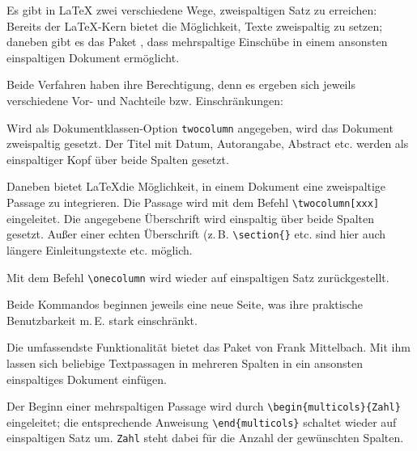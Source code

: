 Es gibt in \LaTeX{} zwei verschiedene Wege, zweispaltigen Satz zu erreichen:
Bereits der \LaTeX -Kern bietet die Möglichkeit, Texte zweispaltig zu setzen;
daneben gibt es das Paket , dass mehrspaltige Einschübe in einem ansonsten
einspaltigen Dokument ermöglicht.

Beide Verfahren haben ihre Berechtigung, denn es ergeben sich jeweils verschiedene
Vor- und Nachteile bzw. Einschränkungen:


Wird als Dokumentklassen-Option \lstinline/twocolumn/ angegeben, wird das Dokument 
zweispaltig gesetzt. 
Der Titel mit Datum, Autorangabe, Abstract etc. werden als einspaltiger Kopf über beide 
Spalten gesetzt.



Daneben bietet \LaTeX die Möglichkeit, in einem Dokument eine zweispaltige Passage
zu integrieren. Die Passage wird mit dem Befehl \lstinline/\twocolumn[xxx] /
eingeleitet. Die angegebene Überschrift wird einspaltig über beide Spalten gesetzt.
Außer einer echten Überschrift (z.\,B. \lstinline/\section{}/ etc. sind hier auch
längere Einleitungstexte etc. möglich.

Mit dem Befehl \lstinline/\onecolumn/ wird wieder auf einspaltigen Satz zurückgestellt.

Beide Kommandos beginnen jeweils eine neue Seite, was ihre praktische Benutzbarkeit m.\,E.
stark einschränkt.



\begin{multicols}{2}
 Die umfassendste Funktionalität bietet das Paket  von Frank Mittelbach.
 Mit ihm lassen sich beliebige Textpassagen in mehreren Spalten in ein ansonsten
 einspaltiges Dokument einfügen.
 
 Der Beginn einer mehrspaltigen Passage wird durch \lstinline/\begin{multicols}{Zahl}/ 
 eingeleitet; die entsprechende Anweisung \lstinline/\end{multicols}/ schaltet wieder
 auf einspaltigen Satz um. \lstinline/Zahl/ steht dabei für die Anzahl der gewünschten 
 Spalten.                                            
\end{multicols}

